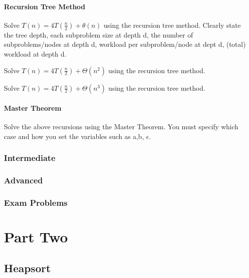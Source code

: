 \documentclass[11pt,fleqn]{book}
\begin{document}
\subsection{Recursion Tree Method}
\begin{example}
Solve $T(n) = 4T(\frac{n}{2}) + \theta(n)$ using the recursion tree method. Clearly state the tree depth, each subproblem size at depth d, the number of subproblems/nodes at depth d, workload per subproblem/node at dept d, (total) workload at depth d. 
\end{example}
\begin{example}
Solve $T(n) = 4T(\frac{n}{2}) + \Theta(n^2)$ using the recursion tree method. 
\end{example}
\begin{example}
Solve $T(n) = 4T(\frac{n}{2}) + \Theta(n^3)$ using the recursion tree method. 
\end{example}
\subsection{Master Theorem}
\begin{example}
Solve the above recursions using the Master Theorem. You must specify which case and how you set the variables such as a,b, $\epsilon$.
\end{example}
\section{Intermediate}
\section{Advanced}
\section{Exam Problems}



\part{Part Two}


\chapter{Heapsort}
\end{document}
